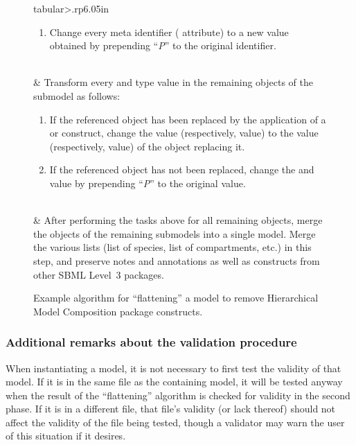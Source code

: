 \begin{figure}[thb]
\begin{edtable}{tabular}{>{\therownum.}rp{6.05in}}
\begin{enumerate}[leftmargin=3ex,label={\alph*})]
    \item Change every meta identifier ( attribute) to a
      new value obtained by prepending ``\emph{P}'' to the original
      identifier.

    \vspace*{-0.5em}
    \end{enumerate}
    \\

    & Transform every  and  type value
    in the remaining objects of the submodel as follows:
    \begin{enumerate}[leftmargin=3ex,label={\alph*})]

    \item If the referenced object has been replaced by the application
      of a \ReplacedBy or \ReplacedElement construct, change the
       value (respectively,  value) to
      the  value (respectively,  value) of
      the object replacing it.

    \item If the referenced object has not been replaced, change the
       and  value by prepending
      ``\emph{P}'' to the original value.

    \vspace*{-0.5em}
    \end{enumerate}
    \\

    & After performing the tasks above for all remaining objects, merge
    the objects of the remaining submodels into a single model.  Merge
    the various lists (list of species, list of compartments, etc.)  in
    this step, and preserve notes and annotations as well as constructs
    from other SBML Level~3 packages.
    \\
    \bottomrule
  \end{edtable}
  \caption{Example algorithm for ``flattening'' a model to remove
    Hierarchical Model Composition package constructs.}
  \label{flattening-algo}
\end{figure}


\subsubsection{Additional remarks about the validation procedure}

When \notice instantiating a model, it is not necessary to first test
the validity of that model.  If it is in the same file as the containing
model, it will be tested anyway when the result of the ``flattening''
algorithm is checked for validity in the second phase.  If it is in a
different file, that file's validity (or lack thereof) should not affect
the validity of the file being tested, though a validator may warn the
user of this situation if it desires.


